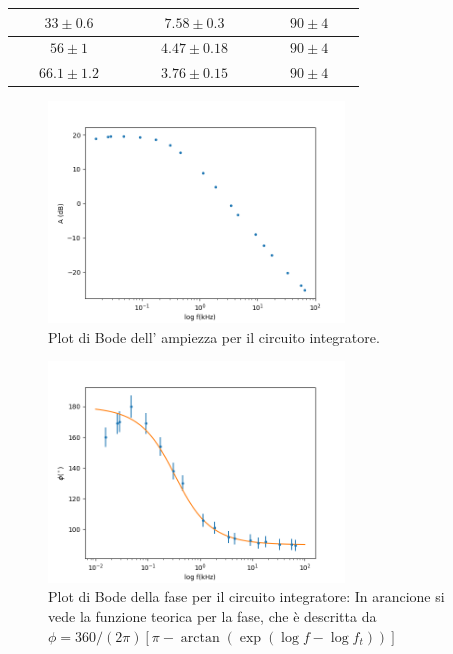 \documentclass[10pt,a4paper]{article}
\newcommand{\exn}{\phantom{xxx}}
\begin{document}
\begin{table}[h]
\begin{center}
\begin{tabular}{|c|c|c|}
				\hline
				$\exn 33\pm 0.6\exn $& $\exn7.58 \pm  0.3
   \exn $ & $\exn90 \pm 4 \exn $ \\
				\hline
				$\exn 56\pm 1 \exn $  & $\exn 4.47\pm0.18   \exn $ & $\exn 90\pm 4\exn $ \\
				
				
				\hline
				$\exn 66.1\pm 1.2\exn $ & $\exn3.76 \pm  0.15 \exn $ & $\exn90 \pm 4\exn $ \\
			
				
				\hline
				
				
				
				
			\end{tabular}
		\end{center}
	\end{table} 


	\begin{figure}[htb]
		\begin{center}
			
			\includegraphics[width=0.7\textwidth]{bodeint}
			
	\end{center}
		\caption{\small Plot di Bode dell' ampiezza  per il circuito integratore.}
		\label{fig:bodeinte}
	\end{figure}

\begin{figure}[htb]
		\begin{center}
			\includegraphics[width=0.7\textwidth]{fase}
		\end{center}
		\caption{\small Plot di Bode della fase per il circuito integratore: In arancione si vede la funzione teorica per la fase, che è descritta da $\phi = 360/(2\pi)[\pi - \arctan(\exp{(\log f -\log f_t)})]$}
		\label{fig:bodeinte}
	\end{figure}
	 
\end{document}
